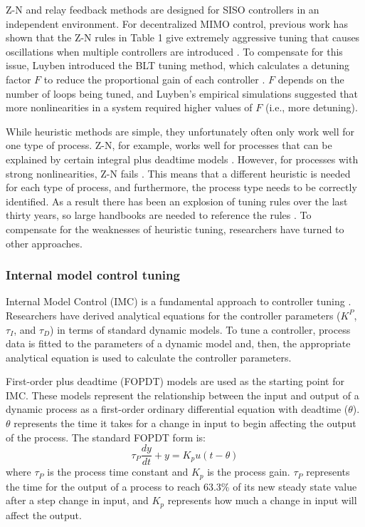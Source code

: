 Z-N and relay feedback methods are designed for SISO controllers in an independent environment. For decentralized MIMO control, previous work has shown that the Z-N rules in Table 1 give extremely aggressive tuning that causes oscillations when multiple controllers are introduced \cite{Riggs2006}. To compensate for this issue, Luyben introduced the BLT tuning method, which calculates a detuning factor $F$ to reduce the proportional gain of each controller \cite{Luyben1986}. $F$ depends on the number of loops being tuned, and Luyben's empirical simulations suggested that more nonlinearities in a system required higher values of $F$ (i.e., more detuning).

While heuristic methods are simple, they unfortunately often only work well for one type of process. Z-N, for example, works well for processes that can be explained by certain integral plus deadtime models \cite{ODwyer2009}. However, for  processes with strong nonlinearities, Z-N fails \cite{Hang1991}. This means that a different heuristic is needed for each type of process, and furthermore, the process type needs to be correctly identified. As a result there has been an explosion of tuning rules over the last thirty years, so large handbooks are needed to reference the rules \cite{ODwyer2009}. To compensate for the weaknesses of heuristic tuning, researchers have turned to other approaches.
 
\subsubsection{Internal model control tuning}
Internal Model Control (IMC) is a fundamental approach to controller tuning \cite{Skogestad2003}. Researchers have derived analytical equations for the controller parameters ($K^P$, $\tau_I$, and $\tau_D$) in terms of standard dynamic models. To tune a controller, process data is  fitted to the parameters of a dynamic model and, then, the appropriate analytical equation is used to calculate the controller parameters.

First-order plus deadtime (FOPDT) models are used as the starting point for IMC. These models represent the relationship between the input and output of a dynamic process as a first-order ordinary differential equation with deadtime ($\theta$). $\theta$ represents the time it takes for a change in input to begin affecting the output of the process. The standard FOPDT form is:
\begin{equation}
    \tau_P \frac{dy}{dt} + y = K_p u(t-\theta)
\end{equation}
where $\tau_P$ is the process time constant and $K_p$ is the process gain. $\tau_P$ represents the time for the output of a process to reach 63.3\% of its new steady state value after a step change in input, and $K_p$ represents how much a change in input will affect the output.  

